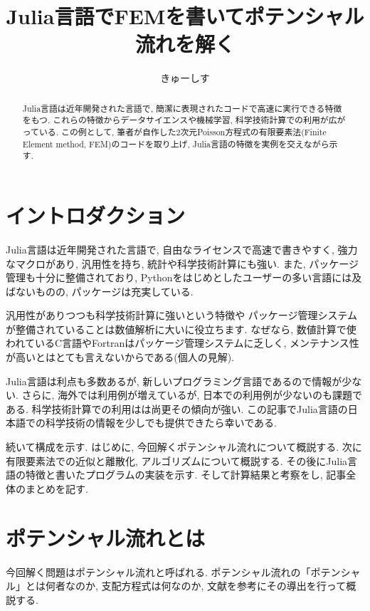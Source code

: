 \documentclass{ltjsarticle}
\begin{document}
\title{Julia言語でFEMを書いてポテンシャル流れを解く}
\author{きゅーしす}
\maketitle
\begin{abstract}
    Julia言語は近年開発された言語で, 簡潔に表現されたコードで高速に実行できる特徴をもつ. 
    これらの特徴からデータサイエンスや機械学習, 科学技術計算での利用が広がっている. 
    この例として, 筆者が自作した2次元Poisson方程式の有限要素法(Finite Element method, FEM)のコードを取り上げ, 
    Julia言語の特徴を実例を交えながら示す. 
\end{abstract}


\section{イントロダクション}
Julia言語は近年開発された言語で, 自由なライセンスで高速で書きやすく, 
強力なマクロがあり, 汎用性を持ち, 統計や科学技術計算にも強い\cite{Bezanson2012}. 
また, パッケージ管理も十分に整備されており, 
Pythonをはじめとしたユーザーの多い言語には及ばないものの, パッケージは充実している. 

汎用性がありつつも科学技術計算に強いという特徴や
パッケージ管理システムが整備されていることは数値解析に大いに役立ちます. 
なぜなら, 数値計算で使われているC言語やFortranはパッケージ管理システムに乏しく, 
メンテナンス性が高いとはとても言えないからである(個人の見解). 

Julia言語は利点も多数あるが, 新しいプログラミング言語であるので情報が少ない. 
さらに, 海外では利用例が増えているが, 日本での利用例が少ないのも課題である. 
科学技術計算での利用はは尚更その傾向が強い. 
この記事でJulia言語の日本語での科学技術の情報を少しでも提供できたら幸いである. 

続いて構成を示す. 
はじめに, 今回解くポテンシャル流れについて概説する. 
次に有限要素法での近似と離散化, アルゴリズムについて概説する. 
その後にJulia言語の特徴と書いたプログラムの実装を示す. 
そして計算結果と考察をし, 記事全体のまとめを記す. 

\section{ポテンシャル流れとは}
今回解く問題はポテンシャル流れと呼ばれる. 
ポテンシャル流れの「ポテンシャル」とは何者なのか, 
支配方程式は何なのか,
文献\cite{Kanbe1995}を参考にその導出を行って概説する. 
\end{document}
